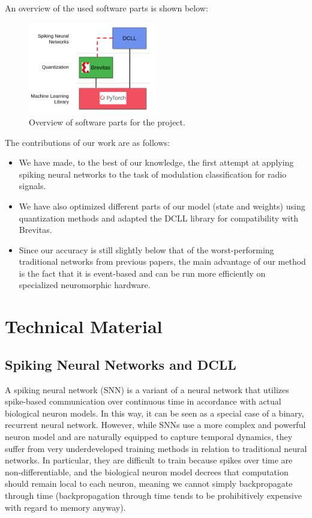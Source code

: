 \documentclass[parskip=true, 10pt]{scrartcl}
\begin{document}
An overview of the used software parts is shown below:

\begin{figure}[H]
    \centering
    \includegraphics[width=0.5\textwidth]{brevitas-graphic.png}
    \caption{Overview of software parts for the project.}
\end{figure}

The contributions of our work are as follows:
\begin{itemize}
    \item We have made, to the best of our knowledge, the first attempt at applying spiking neural networks to the task of modulation classification for radio signals.
    \item We have also optimized different parts of our model (state and weights) using quantization methods and adapted the DCLL library for compatibility with Brevitas.
    \item Since our accuracy is still slightly below that of the worst-performing traditional networks from previous papers, the main advantage of our method is the fact that it is event-based and can be run more efficiently on specialized neuromorphic hardware.
\end{itemize}

\section{Technical Material}


\subsection{Spiking Neural Networks and DCLL}

A spiking neural network (SNN) is a variant of a neural network that utilizes spike-based communication over continuous time in accordance with actual biological neuron models. In this way, it can be seen as a special case of a binary, recurrent neural network. However, while SNNs use a more complex and powerful neuron model and are naturally equipped to capture temporal dynamics, they suffer from very underdeveloped training methods in relation to traditional neural networks. In particular, they are difficult to train because spikes over time are non-differentiable, and the biological neuron model decrees that computation should remain local to each neuron, meaning we cannot simply backpropagate through time (backpropagation through time tends to be prohibitively expensive with regard to memory anyway).
\end{document}

